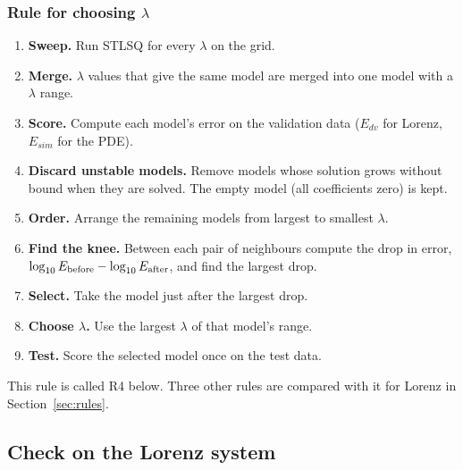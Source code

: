 \documentclass[11pt,a4paper]{article}
\begin{document}
\subsubsection{Rule for choosing $\lambda$}\label{sec:rule}
\begin{enumerate}
  \item \textbf{Sweep.} Run STLSQ for every $\lambda$ on the grid.
  \item \textbf{Merge.} $\lambda$ values that give the same model are merged into one model with a $\lambda$ range.
  \item \textbf{Score.} Compute each model's error on the validation data ($E_{dv}$ for Lorenz, $E_{sim}$ for the PDE).
  \item \textbf{Discard unstable models.} Remove models whose solution grows without bound when they are solved. The empty model (all coefficients zero) is kept.
  \item \textbf{Order.} Arrange the remaining models from largest to smallest $\lambda$.
  \item \textbf{Find the knee.} Between each pair of neighbours compute the drop in error, $\log_{10}E_{\rm before}-\log_{10}E_{\rm after}$, and find the largest drop.
  \item \textbf{Select.} Take the model just after the largest drop.
  \item \textbf{Choose $\lambda$.} Use the largest $\lambda$ of that model's range.
  \item \textbf{Test.} Score the selected model once on the test data.
\end{enumerate}
This rule is called R4 below. Three other rules are compared with it for Lorenz in Section~\ref{sec:rules}.

\subsection{Check on the Lorenz system}
\end{document}
